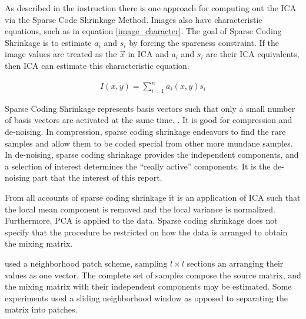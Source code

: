 \documentclass[12pt ]{article}
\begin{document}
As described in the instruction there is one approach for computing out the ICA via the Sparse Code Shrinkage Method.  Images also have characteristic equations, such as in equation \ref{image_character}.  The goal of Sparse Coding Shrinkage is to estimate $a_i$ and $s_i$ by forcing the spareness constraint.  If the image values are treated as the $\vec{x}$ in ICA and $a_i$ and $s_i$ are their ICA equivalents, then ICA can estimate this characteristic equation. 

\begin{eqnarray}
I(x,y) = \sum _{i =1 }^n  a_i (x,y) s_i \label{image_character}%
\end{eqnarray}

Sparse Coding Shrinkage represents basis vectors such that only a small number of basis vectors are activated at the same time.  \cite[397]{appo-ica-book}.  It is good for compression and de-noising.   In compression, sparse coding shrinkage endeavors to find the rare samples and allow them to be coded special from other more mundane samples.   In de-noising, sparse coding shrinkage provides the independent components, and a selection of interest determines the ``really active'' components.  It is the de-noising part that the interest of this report. 

From all accounts of sparse coding shrinkage it is an application of ICA such that the local mean component is removed and the local variance is normalized.    Furthermore, PCA is applied to the data.   Sparse coding shrinkage does not specify that the procedure be restricted on how the data is arranged to obtain the mixing matrix.  

\cite[391-400]{appo-ica-book} used a neighborhood patch scheme, sampling $l \times l$ sections an arranging their values as one vector.  The complete set of samples compose the source matrix, and the mixing matrix with their independent components may be estimated.  Some experiments used a sliding neighborhood window as opposed to separating the matrix into patches.






\end{document}
